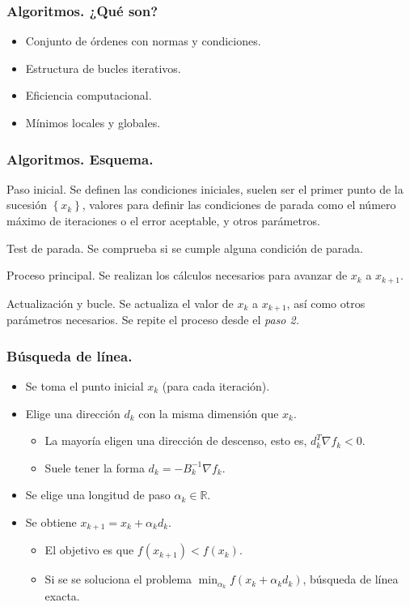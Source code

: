 \documentclass{beamer}
\newcommand{\sucesionxk}{\left\{x_k\right\}}
\begin{document}
\begin{frame}
    \frametitle{Algoritmos. ¿Qué son?}
    \begin{itemize}[label=\textbullet]
        \item Conjunto de órdenes con normas y condiciones. \pause
        \item Estructura de bucles iterativos. \pause
        \item Eficiencia computacional. \pause
        \item Mínimos locales y globales.
    \end{itemize}
\end{frame}
\begin{frame}
    \frametitle{Algoritmos. Esquema.}
    \begin{steps}
		\item Paso inicial. Se definen las condiciones iniciales, suelen ser el primer
		punto de la sucesión $\sucesionxk$, valores para definir las condiciones de
		parada como el número máximo de iteraciones o el error aceptable, y otros parámetros.
        \pause
		\item Test de parada. Se comprueba si se cumple alguna condición de parada.
        \pause
		\item Proceso principal. Se realizan los cálculos necesarios para avanzar de
		$x_k$ a $x_{k+1}$.
        \pause
		\item Actualización y bucle. Se actualiza el valor de $x_k$ a $x_{k+1}$, así como otros parámetros necesarios. Se repite el proceso desde el \textit{paso 2.}
	\end{steps}
\end{frame}

\begin{frame}
    \frametitle{Búsqueda de línea.}
    \begin{itemize}[label=\textbullet]
        \item Se toma el punto inicial $x_k$ (para cada iteración).
        \item Elige una dirección $d_k$ con la misma dimensión que $x_k$.
        \begin{itemize}[label=-]
            \item La mayoría eligen una dirección de descenso, esto es, $d_k^T \nabla f_k < 0$.
            \item Suele tener la forma $d_k = -B_k^{-1}\nabla f_k$.
        \end{itemize}
        \item Se elige una longitud de paso $\alpha_k\in \mathbb{R}$.
        \item Se obtiene $x_{k+1} = x_k + \alpha_k d_k$.
        \begin{itemize}[label=-]
            \item El objetivo es que $f(x_{k+1}) < f(x_k)$.
            \item Si se se soluciona el problema $\min_{\alpha_k} f(x_k + \alpha_k d_k)$, búsqueda de línea exacta.
        \end{itemize}
    \end{itemize}
\end{frame}
\end{document}
